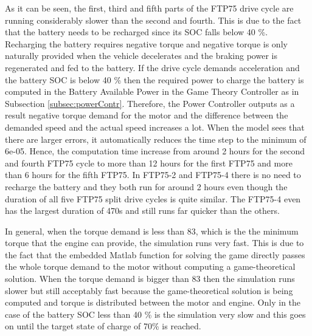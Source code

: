 As it can be seen, the first, third and fifth parts of the FTP75 drive cycle are running considerably slower than the second and fourth. This is due to the fact that the battery needs to be recharged since its SOC falls below 40 \%. Recharging the battery requires negative torque and negative torque is only naturally provided when the vehicle decelerates and the braking power is regenerated and fed to the battery. If the drive cycle demands acceleration and the battery SOC is below 40 \% then the required power to charge the battery is computed in the Battery Available Power in the Game Theory Controller as in Subsection \ref{subsec:powerContr}. Therefore, the Power Controller outputs as a result negative torque demand for the motor and the difference between the demanded speed and the actual speed increases a lot. When the model sees that there are larger errors, it automatically reduces the time step to the minimum of 6e-05. Hence, the computation time increase from around 2 hours for the second and fourth FTP75 cycle to more than 12 hours for the first FTP75 and more than 6 hours for the fifth FTP75. In FTP75-2 and FTP75-4 there is no need to recharge the battery and they both run for around 2 hours even though the duration of all five FTP75 split drive cycles is quite similar. The FTP75-4 even has the largest duration of 470s and still runs far quicker than the others.

In general, when the torque demand is less than 83, which is the the minimum torque that the engine can provide, the simulation runs very fast. This is due to the fact that the embedded Matlab function for solving the game directly passes the whole torque demand to the motor without computing a game-theoretical solution. When the torque demand is bigger than 83 then the simulation runs slower but still acceptably fast because the game-theoretical solution is being computed and torque is distributed between the motor and engine. Only in the case of the battery SOC less than 40 \% is the simulation very slow and this goes on until the target state of charge of 70\% is reached.